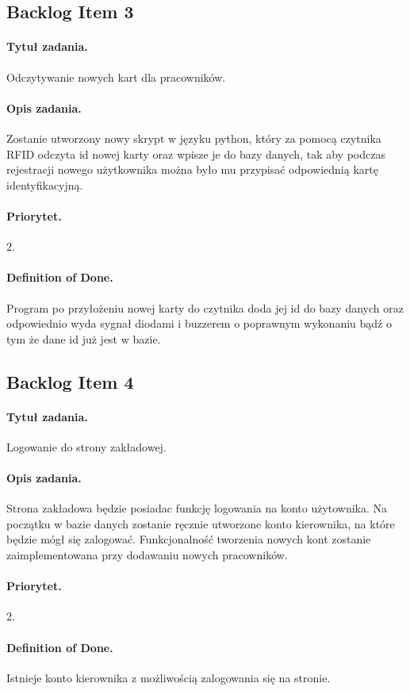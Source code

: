 \documentclass[a4paper]{article}
\begin{document}
\subsection{Backlog Item 3}
\paragraph{Tytuł zadania.} Odczytywanie nowych kart dla pracowników.
\paragraph{Opis zadania.} Zostanie utworzony nowy skrypt w języku python, który za pomocą czytnika RFID odczyta id nowej karty oraz wpisze je do bazy danych, tak aby podczas rejestracji nowego użytkownika można było mu przypisać odpowiednią kartę identyfikacyjną. 
\paragraph{Priorytet.} 2.
\paragraph{Definition of Done.} Program po przyłożeniu nowej karty do czytnika doda jej id do bazy danych oraz odpowiednio wyda sygnał diodami i buzzerem o poprawnym wykonaniu bądź o tym że dane id już jest w bazie.

\subsection{Backlog Item 4}
\paragraph{Tytuł zadania.} Logowanie do strony zakładowej.
\paragraph{Opis zadania.} Strona zakładowa będzie posiadac funkcję logowania na konto użytownika. Na początku w bazie danych zostanie ręcznie utworzone konto kierownika, na które będzie mógł się zalogować. Funkcjonalność tworzenia nowych kont zostanie zaimplementowana przy dodawaniu nowych pracowników.
\paragraph{Priorytet.} 2.
\paragraph{Definition of Done.} Istnieje konto kierownika z możliwością zalogowania się na stronie.
\end{document}
